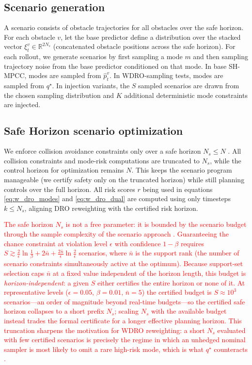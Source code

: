 \documentclass[letterpaper,10pt,conference]{ieeeconf}
\newcommand{\chg}[1]{\textcolor{red}{#1}}
\begin{document}
\subsection{Scenario generation}\label{sec:scenario_gen}

A scenario consists of obstacle trajectories for all obstacles over the safe horizon.
For each obstacle $v$, let the base predictor define a distribution over the stacked
vector $\xi_t^v \in \mathbb{R}^{2N_s}$ (concatenated obstacle positions across the safe horizon).
For each rollout, we generate scenarios by first sampling a mode $m$ and then sampling
trajectory noise from the base predictor conditioned on that mode.
In base SH-MPCC, modes are sampled from $\widehat{p}_t^v$. In WDRO-sampling tests, modes are sampled from $q^\star$. In injection variants, the $S$ sampled scenarios are drawn from the chosen sampling distribution and $K$ additional deterministic mode constraints are injected.

\subsection{Safe Horizon scenario optimization}\label{sec:safe_horizon}

We enforce collision avoidance constraints only over a safe horizon $N_s \le N$
\cite{degroot2023SBMotionBounded}. All collision constraints and mode-risk computations
are truncated to $N_s$, while the control horizon for optimization remains $N$.
This keeps the scenario program manageable (we certify safety only on the truncated
horizon) while still planning controls over the full horizon. All risk scores $r$
being used in equations \eqref{eq:w_dro_modes} and \eqref{eq:w_dro_dual} are computed using only timesteps
$k\le N_s$, aligning DRO reweighting with the certified risk horizon.

\chg{The safe horizon $N_s$ is not a free parameter: it is bounded by the scenario budget through the sample complexity of the scenario approach \cite{Cal2006ScenarioApproach,Ca2018ScenarioTheory}. Guaranteeing the chance constraint at violation level $\epsilon$ with confidence $1-\beta$ requires $S\gtrsim \tfrac{2}{\epsilon}\ln\tfrac1\beta+2\bar n+\tfrac{2\bar n}{\epsilon}\ln\tfrac2\epsilon$ scenarios, where $\bar n$ is the support rank (the number of scenario constraints simultaneously active at the optimum). Because support-set selection caps $\bar n$ at a fixed value independent of the horizon length, this budget is \emph{horizon-independent}: a given $S$ either certifies the entire horizon or none of it. At representative levels ($\epsilon=0.05$, $\beta=0.01$, $\bar n=5$) the certified budget is $S\approx 10^3$ scenarios---an order of magnitude beyond real-time budgets---so the certified safe horizon collapses to a short prefix $N_s$; scaling $N_s$ with the available budget instead trades the formal certificate for a longer effective planning horizon. This truncation sharpens the motivation for WDRO reweighting: a short $N_s$ evaluated with few certified scenarios is precisely the regime in which an unhedged nominal sampler is most likely to omit a rare high-risk mode, which is what $q^\star$ counteracts \cite{degroot2023SBMotionBounded}.}
\end{document}
